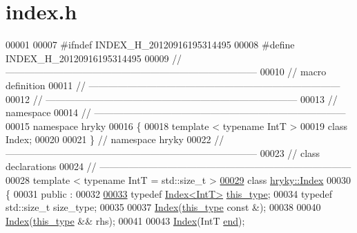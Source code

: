 \hypertarget{index_8h_source}{\section{index.\-h}
}

\begin{DoxyCode}
00001 
00007 \textcolor{preprocessor}{#ifndef INDEX\_H\_20120916195314495}
00008 \textcolor{preprocessor}{}\textcolor{preprocessor}{#define INDEX\_H\_20120916195314495}
00009 \textcolor{preprocessor}{}\textcolor{comment}{//
      ------------------------------------------------------------------------------}
00010 \textcolor{comment}{// macro definition}
00011 \textcolor{comment}{//
      ------------------------------------------------------------------------------}
00012 \textcolor{comment}{//
      ------------------------------------------------------------------------------}
00013 \textcolor{comment}{// namespace}
00014 \textcolor{comment}{//
      ------------------------------------------------------------------------------}
00015 \textcolor{keyword}{namespace }hryky
00016 \{
00018     \textcolor{keyword}{template} < \textcolor{keyword}{typename} IntT >
00019     \textcolor{keyword}{class }Index;
00020 
00021 \} \textcolor{comment}{// namespace hryky}
00022 \textcolor{comment}{//
      ------------------------------------------------------------------------------}
00023 \textcolor{comment}{// class declarations}
00024 \textcolor{comment}{//
      ------------------------------------------------------------------------------}
00028 \textcolor{comment}{}\textcolor{keyword}{template} < \textcolor{keyword}{typename} IntT = std::\textcolor{keywordtype}{size\_t} >
\hypertarget{index_8h_source_l00029}{}\hyperlink{classhryky_1_1_index}{00029} \textcolor{keyword}{class }\hyperlink{classhryky_1_1_index}{hryky::Index}
00030 \{
00031 \textcolor{keyword}{public} :
00032 
\hypertarget{index_8h_source_l00033}{}\hyperlink{classhryky_1_1_index_a0dab4f087ed4d752f8d5040163782102}{00033}     \textcolor{keyword}{typedef} \hyperlink{classhryky_1_1_index}{Index<IntT>} \hyperlink{classhryky_1_1_index_a0dab4f087ed4d752f8d5040163782102}{this_type};
00034     \textcolor{keyword}{typedef} std::size\_t size\_type;
00035 
00037     \hyperlink{classhryky_1_1_index}{Index}(\hyperlink{classhryky_1_1_index}{this_type} \textcolor{keyword}{const} &);
00038 
00040     \hyperlink{classhryky_1_1_index}{Index}(\hyperlink{classhryky_1_1_index}{this_type} && rhs);
00041 
00043     \hyperlink{classhryky_1_1_index}{Index}(IntT \hyperlink{classhryky_1_1_index_a9c9aa7850b38616636afd3148e9bb5f1}{end});

\end{DoxyCode}
